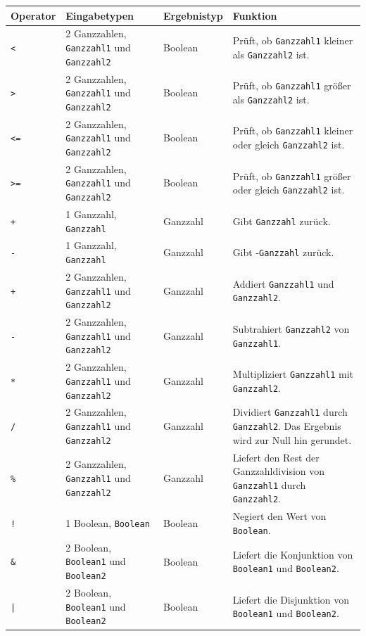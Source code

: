 \documentclass[a4paper,10pt]{article}
\begin{document}
\begin{tabularx}{\textwidth}{| l | X | l | X |}
\hline
\textbf{Operator} & \textbf{Eingabetypen} & \textbf{Ergebnistyp} & \textbf{Funktion}\\
\hline
\texttt{<} & 2 Ganzzahlen, \texttt{Ganzzahl1} und \texttt{Ganzzahl2} & Boolean & Pr\"{u}ft, ob \texttt{Ganzzahl1} kleiner als \texttt{Ganzzahl2} ist.\\
\texttt{>} & 2 Ganzzahlen, \texttt{Ganzzahl1} und \texttt{Ganzzahl2} & Boolean & Pr\"{u}ft, ob \texttt{Ganzzahl1} gr\"{o}\ss{}er als \texttt{Ganzzahl2} ist.\\
\texttt{<=} & 2 Ganzzahlen, \texttt{Ganzzahl1} und \texttt{Ganzzahl2} & Boolean & Pr\"{u}ft, ob \texttt{Ganzzahl1} kleiner oder gleich \texttt{Ganzzahl2} ist.\\
\texttt{>=} & 2 Ganzzahlen, \texttt{Ganzzahl1} und \texttt{Ganzzahl2} & Boolean & Pr\"{u}ft, ob \texttt{Ganzzahl1} gr\"{o}\ss{}er oder gleich \texttt{Ganzzahl2} ist.\\
\texttt{+} & 1 Ganzzahl, \texttt{Ganzzahl} & Ganzzahl & Gibt \texttt{Ganzzahl} zur\"{u}ck.\\
\texttt{-} & 1 Ganzzahl, \texttt{Ganzzahl} & Ganzzahl & Gibt -\texttt{Ganzzahl} zur\"{u}ck.\\
\texttt{+} & 2 Ganzzahlen, \texttt{Ganzzahl1} und \texttt{Ganzzahl2} & Ganzzahl & Addiert \texttt{Ganzzahl1} und \texttt{Ganzzahl2}.\\
\texttt{-} & 2 Ganzzahlen, \texttt{Ganzzahl1} und \texttt{Ganzzahl2} & Ganzzahl & Subtrahiert \texttt{Ganzzahl2} von \texttt{Ganzzahl1}.\\
\texttt{*} & 2 Ganzzahlen, \texttt{Ganzzahl1} und \texttt{Ganzzahl2} & Ganzzahl & Multipliziert \texttt{Ganzzahl1} mit \texttt{Ganzzahl2}.\\
\texttt{/} & 2 Ganzzahlen, \texttt{Ganzzahl1} und \texttt{Ganzzahl2} & Ganzzahl & Dividiert \texttt{Ganzzahl1} durch \texttt{Ganzzahl2}. Das Ergebnis wird zur Null hin gerundet.\\
\texttt{\%} & 2 Ganzzahlen, \texttt{Ganzzahl1} und \texttt{Ganzzahl2} & Ganzzahl & Liefert den Rest der Ganzzahldivision von \texttt{Ganzzahl1} durch \texttt{Ganzzahl2}.\\
\hline
\texttt{!} & 1 Boolean, \texttt{Boolean} & Boolean & Negiert den Wert von \texttt{Boolean}.\\
\texttt{\&} & 2 Boolean, \texttt{Boolean1} und \texttt{Boolean2} & Boolean & Liefert die Konjunktion von \texttt{Boolean1} und \texttt{Boolean2}.\\
\texttt{|} & 2 Boolean, \texttt{Boolean1} und \texttt{Boolean2} & Boolean & Liefert die Disjunktion von \texttt{Boolean1} und \texttt{Boolean2}.\\
\hline
\end{tabularx}
\end{document}
